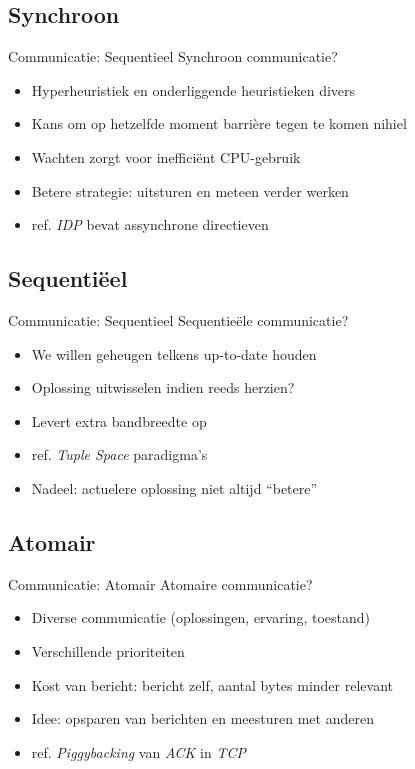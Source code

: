 \documentclass[handout]{beamer}
\begin{document}
\subsection{Synchroon}
\begin{frame}{Communicatie: Sequentieel}
Synchroon communicatie?
\begin{itemize}[<+->]
 \item Hyperheuristiek en onderliggende heuristieken divers
 \item Kans om op hetzelfde moment barri\`ere tegen te komen nihiel
 \item Wachten zorgt voor ineffici\"ent CPU-gebruik
 \item Betere strategie: uitsturen en meteen verder werken
 \item ref. \emph{IDP} bevat assynchrone directieven
\end{itemize}
\end{frame}
\subsection{Sequenti\"eel}
\begin{frame}{Communicatie: Sequentieel}
Sequentie\"ele communicatie?
\begin{itemize}[<+->]
 \item We willen geheugen telkens up-to-date houden
 \item Oplossing uitwisselen indien reeds herzien?
 \item Levert extra bandbreedte op
 \item ref. \emph{Tuple Space} paradigma's
 \item Nadeel: actuelere oplossing niet altijd ``betere''
\end{itemize}
\end{frame}
\subsection{Atomair}
\begin{frame}{Communicatie: Atomair}
Atomaire communicatie?
\begin{itemize}[<+->]
 \item Diverse communicatie (oplossingen, ervaring, toestand)
 \item Verschillende prioriteiten
 \item Kost van bericht: bericht zelf, aantal bytes minder relevant
 \item Idee: opsparen van berichten en meesturen met anderen
 \item ref. \emph{Piggybacking} van \emph{ACK} in \emph{TCP}
\end{itemize}
\end{frame}
\end{document}
